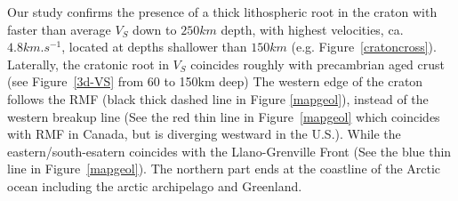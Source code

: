 \documentclass[12pt]{article}
\begin{document}

Our study confirms the presence of a thick lithospheric root in the craton with faster than average $V_S$ down to $250km$ depth, with highest velocities, ca. $4.8km.s^{-1}$, located at depths shallower than  $150km$ (e.g. Figure~\ref{cratoncross}). 
Laterally, the cratonic root in $V_S$ coincides roughly with precambrian aged crust (see Figure~\ref{3d-VS} from 60 to 150km deep)
The western edge of the craton follows the RMF (black thick dashed line in Figure \ref{mapgeol}), instead of the western breakup line (See the red thin line in Figure~\ref{mapgeol} which coincides with RMF in Canada, but is diverging westward in the U.S.). While the eastern/south-esatern coincides with the Llano-Grenville Front (See the blue thin line in Figure~\ref{mapgeol}). 
The northern part ends at the coastline of the Arctic ocean including the arctic archipelago and Greenland. 
\end{document}
